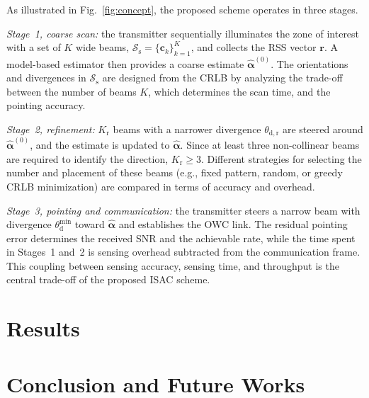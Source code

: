 \documentclass[journal]{IEEEtran}
\begin{document}
As illustrated in Fig.~\ref{fig:concept}, the proposed scheme operates in
three stages.

\emph{Stage~1, coarse scan:} the transmitter sequentially illuminates the
zone of interest with a set of $K$ wide beams,
$\mathcal{S}_{\mathrm{s}}=\{\mathbf{c}_k\}_{k=1}^{K}$, and collects the
RSS vector $\mathbf{r}$. A model-based estimator then provides a coarse
estimate $\hat{\boldsymbol{\alpha}}^{(0)}$. The orientations and
divergences in $\mathcal{S}_{\mathrm{s}}$ are designed from the CRLB by
analyzing the trade-off between the number of beams $K$, which determines
the scan time, and the pointing accuracy.

\emph{Stage~2, refinement:} $K_{\mathrm{r}}$ beams with a narrower
divergence $\theta_{\mathrm{d,r}}$ are steered around
$\hat{\boldsymbol{\alpha}}^{(0)}$, and the estimate is updated to
$\hat{\boldsymbol{\alpha}}$. Since at least three non-collinear beams are
required to identify the direction,
$K_{\mathrm{r}}\geq3$. Different strategies for selecting the number and
placement of these beams (e.g., fixed pattern, random, or greedy CRLB
minimization) are compared in terms of accuracy and overhead.

\emph{Stage~3, pointing and communication:} the transmitter steers a
narrow beam with divergence $\theta_{\mathrm{d}}^{\min}$ toward
$\hat{\boldsymbol{\alpha}}$ and establishes the OWC link. The residual
pointing error determines the received SNR and the achievable rate,
while the time spent in Stages~1 and~2 is sensing overhead subtracted
from the communication frame. This coupling between sensing accuracy,
sensing time, and throughput is the central trade-off of the proposed
ISAC scheme.





\section{Results}


\section{Conclusion and Future Works}




\end{document}
